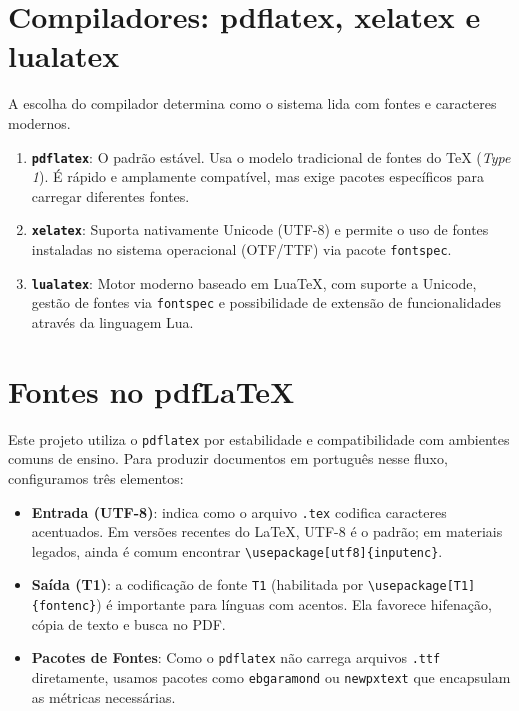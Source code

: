 \section{Compiladores: pdflatex, xelatex e lualatex}

A escolha do compilador determina como o sistema lida com fontes e caracteres modernos.

\begin{enumerate}
    \item \textbf{\texttt{pdflatex}}: O padrão estável. Usa o modelo tradicional de fontes do TeX (\textit{Type 1}). É rápido e amplamente compatível, mas exige pacotes específicos para carregar diferentes fontes.
    \item \textbf{\texttt{xelatex}}: Suporta nativamente Unicode (UTF-8) e permite o uso de fontes instaladas no sistema operacional (OTF/TTF) via pacote \texttt{fontspec}.
    \item \textbf{\texttt{lualatex}}: Motor moderno baseado em LuaTeX, com suporte a Unicode, gestão de fontes via \texttt{fontspec} e possibilidade de extensão de funcionalidades através da linguagem Lua.
\end{enumerate}

\section{Fontes no pdfLaTeX}

Este projeto utiliza o \texttt{pdflatex} por estabilidade e compatibilidade com ambientes comuns de ensino. Para produzir documentos em português nesse fluxo, configuramos três elementos:

\begin{itemize}
    \item \textbf{Entrada (UTF-8)}: indica como o arquivo \texttt{.tex} codifica caracteres acentuados. Em versões recentes do \LaTeX, UTF-8 é o padrão; em materiais legados, ainda é comum encontrar \verb|\usepackage[utf8]{inputenc}|.
    \item \textbf{Saída (T1)}: a codificação de fonte \texttt{T1} (habilitada por \verb|\usepackage[T1]{fontenc}|) é importante para línguas com acentos. Ela favorece hifenação, cópia de texto e busca no PDF.
    \item \textbf{Pacotes de Fontes}: Como o \texttt{pdflatex} não carrega arquivos \texttt{.ttf} diretamente, usamos pacotes como \texttt{ebgaramond} ou \texttt{newpxtext} que encapsulam as métricas necessárias.
\end{itemize}

